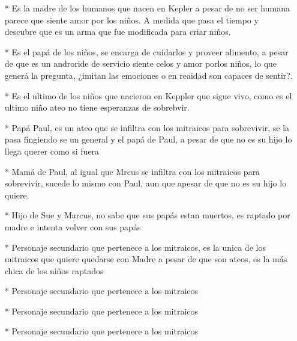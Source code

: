 \documentclass[ä5paper, 11pt]{article}
\begin{document}
            \begin{enumerate}
                \item[*] Es la madre de los humanos que nacen en Kepler a pesar de no ser humana parece que siente amor por los niños. A medida que pasa el tiempo y descubre que es un arma que fue modificada para criar niños.
                \item[*] Es el papá de los niños, se encarga de cuidarlos y proveer alimento, a pesar de que es un androride de servicio siente celos y amor porlos niños, lo que generá la pregunta, ¿imitan las emociones o en reaidad son capaces de sentir?.
                \item[*] Es el ultimo de los niños que nacieron en Keppler que sigue vivo, como es el ultimo niño ateo no tiene esperanzas de sobrebvir. 
                \item[*]Papá Paul, es un ateo que se infiltra con los mitraicos para sobrevivir, se la pasa fingiendo se un general y el papá de Paul, a pesar de que no es su hijo lo llega querer como si fuera
                \item[*] Mamá de Paul, al igual que Mrcus se infiltra con los mitraicos para sobrevivir, sucede lo mismo con Paul, aun que apesar de que no es su hijo lo quiere.
                \item[*] Hijo de Sue y Marcus, no sabe que sus papás estan muertos, es raptado por madre e intenta volver con sus papás
                \item[*] Personaje secundario que pertenece a los mitraicos, es la unica de los mitraicos que quiere quedarse con Madre a pesar de que son ateos, es la más chica de los niños raptados
                \item[*] Personaje secundario que pertenece a los mitraicos
                \item[*] Personaje secundario que pertenece a los mitraicos
                \item[*] Personaje secundario que pertenece a los mitraicos
            \end{enumerate}
\end{document}
